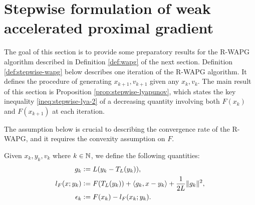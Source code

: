 \documentclass[12pt]{article}
\begin{document}
\section{Stepwise formulation of weak accelerated proximal gradient}\label{sec:stepwise-stuff}
    The goal of this section is to provide some preparatory results for the R-WAPG algorithm described in Definition \ref{def:wapg} of the next section.
    Definition \ref{def:stepwise-wapg} below describes one iteration of the R-WAPG algorithm.
    It defines the procedure of generating $x_{k + 1}, v_{k + 1}$ given any $x_k, v_k$.
    The main result of this section is Proposition \ref{prop:stepwise-lyapunov}, which states the key inequality \eqref{ineq:stepwise-lya-2}  of a decreasing quantity involving both $F(x_k)$ and $F(x_{k + 1})$ at each iteration.
    \par
    The assumption below is crucial to describing the convergence rate of the R-WAPG, and it requires the convexity assumption on $F$.
    \begin{assumption}\label{ass:regret-gap}
        Given $x_k, y_k, v_k$ where $k \in \mathbb {\mathbb N}$, we define the following quantities:
        \begin{align}
            g_k &\vcentcolon= L(y_k - T_L(y_k)),
            \label{eqn:grad-map}
            \\
            l_F(x; y_k) &\vcentcolon= F(T_L(y_k)) + \langle g_k, x - y_k\rangle + \frac{1}{2L}\Vert g_k\Vert^2,
            \label{eqn:lower-linearization}
            \\
            \epsilon_{k} &\vcentcolon= F(x_k) - l_F(x_k; y_k).
            \label{eqn:regret}
        \end{align}
    \end{assumption}
\end{document}
